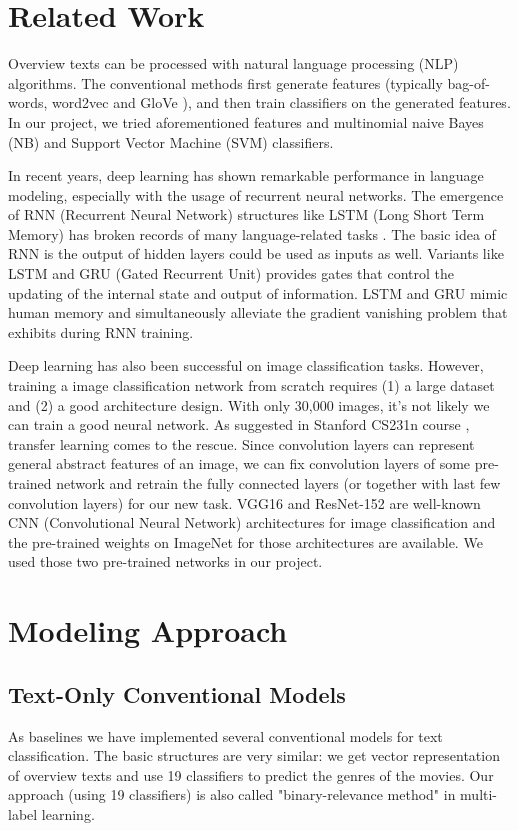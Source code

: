 \documentclass[12pt]{article} %
\begin{document}
\section{Related Work}

Overview texts can be processed with natural language processing (NLP) algorithms. The conventional  methods first generate features (typically bag-of-words, word2vec \cite{word2vec} and GloVe \cite{glove}), and then train classifiers on the generated features. In our project, we tried aforementioned features and multinomial naive Bayes (NB) and Support Vector Machine (SVM) classifiers.

In recent years, deep learning has shown remarkable performance in language modeling, especially with the usage of recurrent neural networks. The emergence of RNN (Recurrent Neural Network) structures like LSTM (Long Short Term Memory) has broken records of many language-related tasks \cite{lstm}. The basic idea of RNN is the output of hidden layers could be used as inputs as well. Variants like LSTM and GRU (Gated Recurrent Unit) \cite{gru} provides gates that control the updating of the internal state and output of information. LSTM and GRU mimic human memory and simultaneously alleviate the gradient vanishing problem that exhibits during RNN training.

Deep learning has also been successful on image classification tasks. However, training a image classification network from scratch requires (1) a large dataset and (2) a good architecture design. With only 30,000 images, it's not likely we can train a good neural network. As suggested in Stanford CS231n course \cite{transferl}, transfer learning comes to the rescue. Since convolution layers can represent general abstract features of an image, we can fix convolution layers of some pre-trained network and retrain the fully connected layers (or together with last few convolution layers) for our new task. VGG16 \cite{vgg} and ResNet-152 \cite{resnet} are well-known CNN (Convolutional Neural Network) architectures for image classification and the pre-trained weights on ImageNet for those architectures are available. We used those two pre-trained networks in our project.


\section{Modeling Approach}

\subsection{Text-Only Conventional Models}
As baselines we have implemented several conventional models for text classification. The basic structures are very similar: we get vector representation of overview texts and use 19 classifiers to predict the genres of the movies. Our approach (using 19 classifiers) is also called "binary-relevance method" in multi-label learning.
\end{document}
